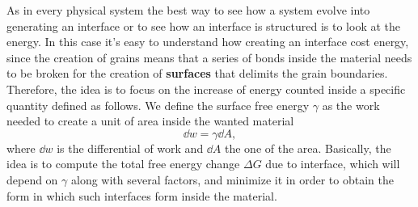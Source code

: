As in every physical system the best way to see how a system evolve into generating an interface or to see how an interface is structured is to look at the energy. In this case it's easy to understand how creating an interface cost energy, since the creation of grains means that a series of bonds inside the material needs to be broken for the creation of \textbf{surfaces} that delimits the grain boundaries. Therefore, the idea is to focus on the increase of energy counted inside a specific quantity defined as follows.
{
    We define the surface free energy $\gamma$ as the work needed to create a unit of area inside the wanted material
    \begin{equation}
        \dd w = \gamma \dd A,
    \end{equation}
    where $\dd w$ is the differential of work and $\dd A$ the one of the area.
}
\noindent
Basically, the idea is to compute the total free energy change $\Delta G$ due to interface, which will depend on $\gamma$ along with several factors, and minimize it in order to obtain the form in which such interfaces form inside the material. 

